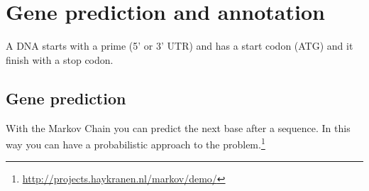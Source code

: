 \section{Gene prediction and annotation}
A DNA starts with a prime (5' or 3' UTR) and has a start codon (ATG) and it 
finish with a stop codon.

\subsection{Gene prediction}
With the Markov Chain you can predict the next base after a sequence. In this 
way you can have a probabilistic approach to the 
problem.\footnote{\url{http://projects.haykranen.nl/markov/demo/}}